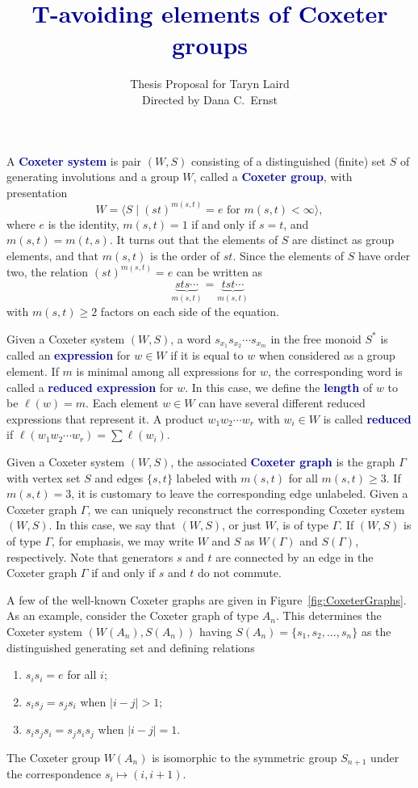 \documentclass[10pt]{amsart}
\newcommand{\alert}[1]{\textcolor{darkblue}{\textbf{#1}}}
\begin{document}
\title{\alert{T-avoiding elements of Coxeter groups}}
\author{Thesis Proposal for Taryn Laird\\
Directed by Dana C.~Ernst}
 
\maketitle

A \alert{Coxeter system} is pair $(W,S)$ consisting of a distinguished (finite) set $S$ of generating involutions and a group $W$, called a \alert{Coxeter group}, with presentation
\[
W = \langle S \mid (st)^{m(s, t)} = e \text{ for } m(s, t) < \infty \rangle,
\]
where $e$ is the identity, $m(s,t) = 1$ if and only if $s = t$, and $m(s,t) = m(t,s)$. It turns out that the elements of $S$ are distinct as group elements, and that $m(s, t)$ is the order of $st$.  Since the elements of $S$ have order two, the relation $(st)^{m(s,t)} = e$ can be written as
\[
\underbrace{sts \cdots}_{m(s,t)} = \underbrace{tst \cdots}_{m(s,t)}
\]
with $m(s,t) \geq 2$ factors on each side of the equation.

Given a Coxeter system $(W,S)$, a word $s_{x_1}s_{x_2}\cdots s_{x_m}$ in the free monoid $S^*$ is called an \alert{expression} for $w\in W$ if it is equal to $w$ when considered as a group element. If $m$ is minimal among all expressions for $w$, the corresponding word is called a \alert{reduced expression} for $w$. In this case, we define the \alert{length} of $w$ to be $\ell(w)=m$. Each element $w \in W$ can have several different reduced expressions that represent it.  A product $w_{1}w_{2}\cdots w_{r}$ with $w_{i} \in W$ is called \alert{reduced} if $\ell(w_{1}w_{2}\cdots w_{r})=\sum \ell(w_{i})$.

Given a Coxeter system $(W,S)$, the associated \alert{Coxeter graph} is the graph $\Gamma$ with vertex set $S$ and edges $\{s,t\}$ labeled with $m(s,t)$ for all $m(s,t)\geq 3$.  If $m(s,t)=3$, it is customary to leave the corresponding edge unlabeled.  Given a Coxeter graph $\Gamma$, we can uniquely reconstruct the corresponding Coxeter system $(W,S)$.  In this case, we say that $(W,S)$, or just $W$, is of type $\Gamma$. If $(W,S)$ is of type $\Gamma$, for emphasis, we may write $W$ and $S$ as $W(\Gamma)$ and $S(\Gamma)$, respectively.  Note that generators $s$ and $t$ are connected by an edge in the Coxeter graph $\Gamma$ if and only if $s$ and $t$ do not commute. 

A few of the well-known Coxeter graphs are given in Figure~\ref{fig:CoxeterGraphs}. As an example, consider the Coxeter graph of type $A_n$. This determines the Coxeter system $(W(A_n),S(A_n))$ having $S(A_n) = \{s_1, s_2, \ldots, s_n\}$ as the distinguished generating set and defining relations
\begin{enumerate}
\item $s_is_i = e$ for all $i$;
\item $s_is_j = s_js_i$ when $|i-j| > 1$;
\item $s_is_js_i = s_js_is_j$ when $|i-j| = 1$.
\end{enumerate}
The Coxeter group $W(A_n)$ is isomorphic to the symmetric group $S_{n+1}$ under the correspondence $s_i\mapsto (i,i+1)$.
\end{document}
